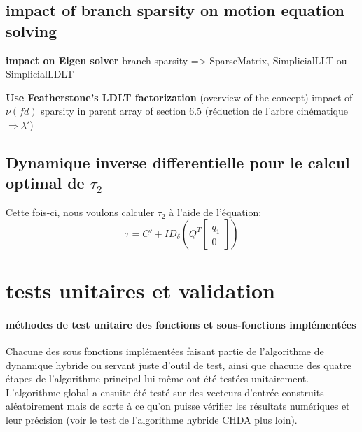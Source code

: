 \documentclass{report}
\begin{document}
\subsection{impact of branch sparsity on motion equation solving}
\textbf{impact on Eigen solver}
branch sparsity => SparseMatrix, SimplicialLLT ou SimplicialLDLT

\textbf{Use Featherstone's LDLT factorization}  (overview of the concept)
impact of $\nu(fd)$ sparsity in parent array of section 6.5 (réduction de l'arbre cinématique $\Rightarrow \lambda'$)

\subsection{Dynamique inverse differentielle pour le calcul optimal de $\tau_2$}

Cette fois-ci, nous voulons calculer $\tau_2$ à l'aide  de l'équation:
\begin{equation}
\tau = C' + ID_{\delta} \left( Q^T \begin{bmatrix} 
                                                       \ddot{q}_1 \\
                                                       0 
                                                   \end{bmatrix} \right)
\end{equation}


\section{tests unitaires et validation}

\paragraph{méthodes de test unitaire des fonctions et sous-fonctions implémentées}

Chacune des sous fonctions implémentées faisant partie de l'algorithme de dynamique hybride ou servant juste d'outil de test, ainsi que chacune des quatre étapes de l'algorithme principal lui-même ont été testées unitairement. L'algorithme global a ensuite été testé sur des vecteurs d'entrée construits aléatoirement mais de sorte à ce qu'on puisse vérifier les résultats numériques et leur précision (voir le test de l'algorithme hybride CHDA plus loin).
\end{document}
